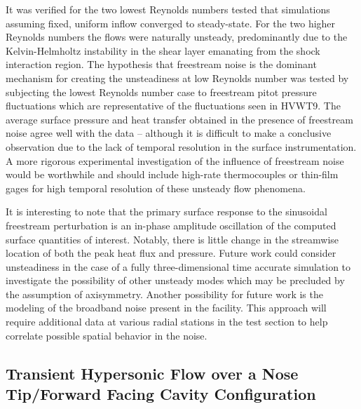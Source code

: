 It was verified for the two lowest Reynolds numbers tested that simulations assuming fixed, uniform inflow converged to steady-state.  For the two higher Reynolds numbers the flows were naturally unsteady, predominantly due to the Kelvin-Helmholtz instability in the shear layer emanating from the shock interaction region.
The hypothesis that freestream noise is the dominant mechanism for creating the unsteadiness at low Reynolds number was tested by subjecting the lowest Reynolds number case to freestream pitot pressure fluctuations which are representative of the fluctuations seen in HVWT9.  The average surface pressure and heat transfer obtained in the presence of freestream noise agree well with the data -- although it is difficult to make a conclusive observation due to the lack of temporal resolution in the surface instrumentation.  A more rigorous experimental investigation of the influence of freestream noise would be worthwhile and should include high-rate thermocouples or thin-film gages for high temporal resolution of these unsteady flow phenomena.

It is interesting to note that the primary surface response to the sinusoidal freestream perturbation is an in-phase amplitude oscillation of the computed surface quantities of interest.  Notably, there is little change in the streamwise location of both the peak heat flux and pressure.  Future work could consider unsteadiness in the case of a fully three-dimensional time accurate simulation to investigate the possibility of other unsteady modes which may be precluded by the assumption of axisymmetry.  Another possibility for future work is the modeling of the broadband noise present in the facility.  This approach will require additional data at various radial stations in the test section to help correlate possible spatial behavior in the noise.


\clearpage
\subsection{Transient Hypersonic Flow over a Nose Tip/Forward Facing Cavity Configuration}

